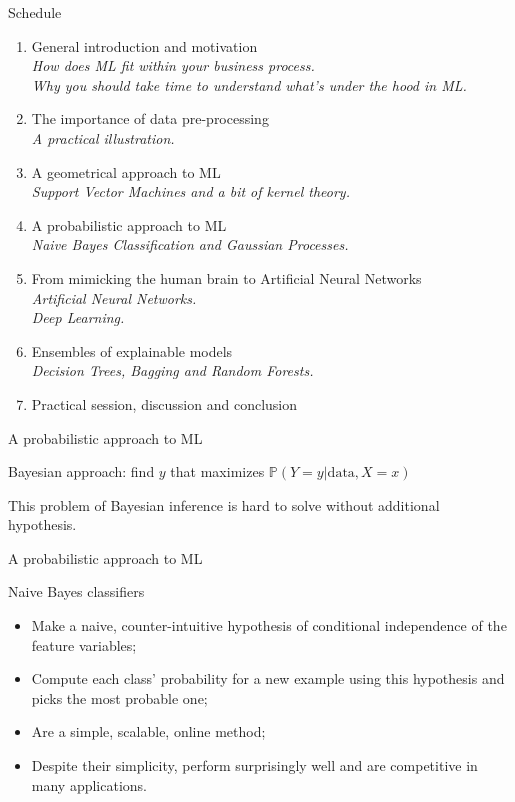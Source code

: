 \documentclass{beamer}
\begin{document}
\begin{frame}{Schedule}
\begin{enumerate}
\item General introduction and motivation \Checkmark \\
{\small \it How does ML fit within your business process.\\
Why you should take time to understand what's under the hood in ML.}
\item The importance of data pre-processing \Checkmark \\
{\small \it A practical illustration.}
\item A geometrical approach to ML \Checkmark \\
{\small \it Support Vector Machines and a bit of kernel theory.}
\item A probabilistic approach to ML\\
{\small \it Naive Bayes Classification and Gaussian Processes.}
\item From mimicking the human brain to Artificial Neural Networks\\
{\small \it Artificial Neural Networks.\\
Deep Learning.}
\item Ensembles of explainable models\\
{\small \it Decision Trees, Bagging and Random Forests.}
\item Practical session, discussion and conclusion
\end{enumerate}
\end{frame}

\begin{frame}{A probabilistic approach to ML}
\begin{block}{}
Bayesian approach: find $y$ that maximizes $\mathbb{P}(Y=y|\textrm{data}, X=x)$
\end{block}
This problem of Bayesian inference is hard to solve without additional hypothesis.
\end{frame}

\begin{frame}{A probabilistic approach to ML}
\begin{block}{Naive Bayes classifiers}
\begin{itemize}
\item Make a naive, counter-intuitive hypothesis of conditional independence of the feature variables;
\item Compute each class' probability for a new example using this hypothesis and picks the most probable one;
\item Are a simple, scalable, online method;
\item Despite their simplicity, perform surprisingly well and are competitive in many applications.
\end{itemize}
\end{block}

\end{frame}
\end{document}
